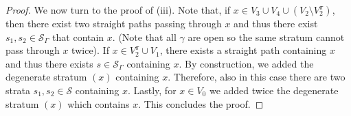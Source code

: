 \documentclass[reqno]{amsart}
\theoremstyle{plain}
\theoremstyle{definition}
\numberwithin{equation}{section}
\begin{document}
\begin{proof}
 


We now turn to the proof of {\rm (iii)}. Note that, if $x \in V_3\cup V_4 \cup (V_2 \setminus V_2^\pi)$, then there exist two straight paths passing through $x$ and thus there exist $s_1,s_2 \in \mathcal{S}_\Gamma$ that contain $x$. (Note that all $\gamma$ are open so the same stratum cannot pass through $x$ twice). If $x\in V_2^\pi \cup V_1$, there exists a straight path containing $x$ and thus there exists $s \in \mathcal{S}_\Gamma$ containing $x$. By construction, we added the degenerate stratum $(x)$ containing $x$. Therefore, also in this case there are two strata $s_1,s_2 \in \mathcal{S}$ containing $x$. Lastly, for  $x \in V_0$ we added twice the degenerate stratum $(x)$  which contains $x$. This concludes the proof.  
\end{proof}
\end{document}
